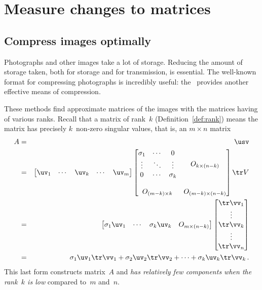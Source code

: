 
\section{Measure changes to matrices}
\label{sec:mctm}
\secttoc




\subsection{Compress images optimally}
\label{sec:ciio}


Photographs and other images take a lot of storage.
Reducing the amount of storage taken, both for storage and for transmission, is essential.
The well-known  format for compressing photographs is incredibly useful: the \svd\ provides another effective means of compression.

These methods find approximate matrices of the images with the matrices having of various ranks.
Recall that a matrix of rank~\(k\) (Definition~\ref{def:rank}) means the matrix has precisely \(k\)~non-zero singular values, that is, an \(m\times n\) matrix
\begin{eqnarray*}
A&=&\usv
\\&=&
\begin{bmatrix} \uv_1&\cdots&\uv_k&\cdots&\uv_m \end{bmatrix}
\begin{bmatrix} \begin{matrix} \sigma_1&\cdots&0\\
\vdots&\ddots&\vdots\\
0&\cdots&\sigma_k \end{matrix} & 
O_{k\times (n-k)}\\\,\\
O_{(m-k)\times k}&O_{(m-k)\times (n-k)}\end{bmatrix}
\tr V
\\&=&
\begin{bmatrix} \sigma_1\uv_1&\cdots&\sigma_k\uv_k&O_{m\times(n-k)} \end{bmatrix}
\begin{bmatrix} \tr\vv_1\\\vdots\\\tr\vv_k\\\vdots\\\tr\vv_n \end{bmatrix}
\\&=&
\sigma_1\uv_1\tr\vv_1+\sigma_2\uv_2\tr\vv_2+\cdots+\sigma_k\uv_k\tr\vv_k\,.
\end{eqnarray*}
This last form constructs matrix~\(A\) and \emph{has relatively few components when the rank~\(k\) is low} compared to~\(m\) and~\(n\).




